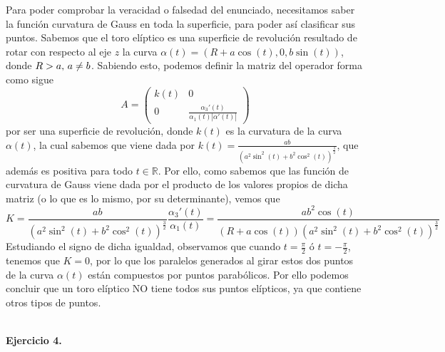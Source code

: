 \documentclass[fleqn]{article}
\def\R{\mathds{R}}
\begin{document}
    Para poder comprobar la veracidad o falsedad del enunciado, necesitamos saber la función curvatura de Gauss en toda la superficie, para poder así clasificar sus puntos. Sabemos que el 
    toro elíptico es una superficie de revolución resultado de rotar con respecto al eje $z$ la curva $\alpha(t) = (R + a\cos(t), 0, b\sin(t))$, donde $R>a, \thinspace a \neq b$. Sabiendo esto,
    podemos definir la matriz del operador forma como sigue 
    $$A=
    \begin{pmatrix}
        k(t) & 0 \\
        0 & \frac{\alpha_3'(t)}{\alpha_1(t) |\alpha'(t)|}
    \end{pmatrix}
    $$
    por ser una superficie de revolución, donde $k(t)$ es la curvatura de la curva $\alpha(t)$, la cual sabemos que viene dada por $k(t)=\frac{ab}{(a^2\sin^2(t) + b^2 \cos^2(t))^{\frac{3}{2}}}$, que además es positiva
    para todo $t\in \R$. Por ello, como sabemos que las función de curvatura de Gauss viene dada por el producto de los valores propios de dicha matriz (o lo que es lo mismo, por su determinante), vemos que
    $$K = \frac{ab}{(a^2\sin^2(t) + b^2 \cos^2(t))^{\frac{3}{2}}} \frac{\alpha_3'(t)}{\alpha_1(t)} = \frac{ab^2 \cos(t)}{(R + a\cos(t))(a^2\sin^2(t) + b^2 \cos^2(t))^{\frac{3}{2}}}$$
    Estudiando el signo de dicha igualdad, observamos que cuando $t=\frac{\pi}{2}$ ó $t=-\frac{\pi}{2}$, tenemos que $K=0$, por lo que los paralelos generados al girar estos dos puntos
    de la curva $\alpha(t)$ están compuestos por puntos parabólicos. Por ello podemos concluir que un toro elíptico NO tiene todos sus puntos elípticos, ya que contiene otros 
    tipos de puntos. \\ \\

    \newpage

    \textbf{Ejercicio 4. } \\
   
\end{document}
